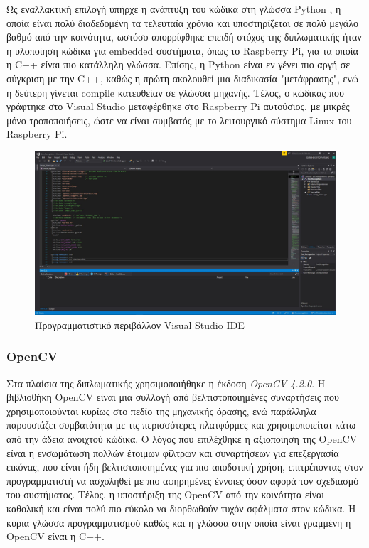 Ως εναλλακτική επιλογή υπήρχε η ανάπτυξη του κώδικα στη γλώσσα Python \cite{wiki:python}, η οποία είναι πολύ διαδεδομένη τα τελευταία χρόνια και υποστηρίζεται σε πολύ μεγάλο βαθμό από την κοινότητα, ωστόσο απορρίφθηκε επειδή στόχος της διπλωματικής ήταν η υλοποίηση κώδικα για embedded συστήματα, όπως το Raspberry Pi, για τα οποία η C++ είναι πιο κατάλληλη γλώσσα. Επίσης, η Python είναι εν γένει πιο αργή σε σύγκριση με την C++, καθώς η πρώτη ακολουθεί μια διαδικασία "μετάφρασης", ενώ η δεύτερη γίνεται compile κατευθείαν σε γλώσσα μηχανής. Τέλος, ο κώδικας που γράφτηκε στο Visual Studio μεταφέρθηκε στο Raspberry Pi αυτούσιος, με μικρές μόνο τροποποιήσεις, ώστε να είναι συμβατός με το λειτουργικό σύστημα Linux του Raspberry Pi.

\begin{figure}[H]
    \centering
    \includegraphics[width=\textwidth]{images/vs17.JPG}
    \caption{Προγραμματιστικό περιβάλλον Visual Studio IDE}
    \label{fig:visual-studio}
\end{figure}

\subsubsection{OpenCV}
Στα πλαίσια της διπλωματικής χρησιμοποιήθηκε η έκδοση \emph{OpenCV 4.2.0}. Η βιβλιοθήκη OpenCV \cite{OpenCVWi26:online} είναι μια συλλογή από βελτιστοποιημένες συναρτήσεις που χρησιμοποιούνται κυρίως στο πεδίο της μηχανικής όρασης, ενώ παράλληλα παρουσιάζει συμβατότητα με τις περισσότερες πλατφόρμες και χρησιμοποιείται κάτω από την άδεια ανοιχτού κώδικα. Ο λόγος που επιλέχθηκε η αξιοποίηση της OpenCV είναι η ενσωμάτωση πολλών έτοιμων φίλτρων και συναρτήσεων για επεξεργασία εικόνας, που είναι ήδη βελτιστοποιημένες για πιο αποδοτική χρήση, επιτρέποντας στον προγραμματιστή να ασχοληθεί με πιο αφηρημένες έννοιες όσον αφορά τον σχεδιασμό του συστήματος. Τέλος, η υποστήριξη της OpenCV από την κοινότητα είναι καθολική και είναι πολύ πιο εύκολο να διορθωθούν τυχόν σφάλματα στον κώδικα. Η κύρια γλώσσα προγραμματισμού καθώς και η γλώσσα στην οποία είναι γραμμένη η OpenCV είναι η C++.


